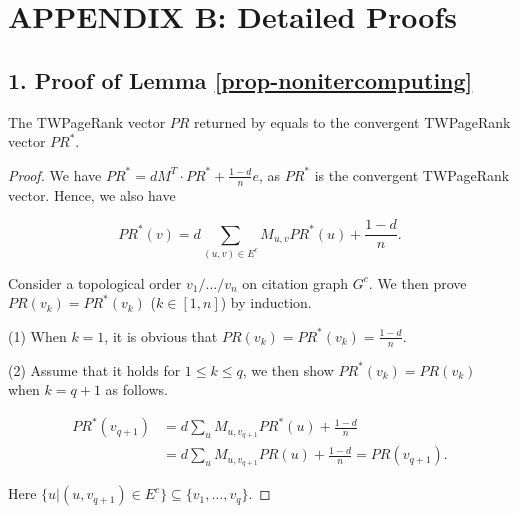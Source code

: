 \newpage


\section*{APPENDIX B: Detailed Proofs}
\label{sec-proof}

\subsection*{1. Proof of Lemma \ref{prop-nonitercomputing}}

The TWPageRank vector $PR$ returned by \twprdag equals to the convergent TWPageRank vector $PR^*$.

\begin{proof}
We have $PR^* = d M^T\cdot PR^* + \frac{1-d}{n} e$, as $PR^*$ is the convergent TWPageRank vector. Hence, we also have
\begin{small}
\begin{equation}
PR^*(v)=d \sum_{(u,v)\in E^c} M_{u,v} PR^*(u) + \frac{1-d}{n}.
\end{equation}
\end{small}

\vspace{-1ex}

Consider a topological order $v_1/\dots/v_n$ on citation graph $G^c$. We then prove $PR(v_k)=PR^*(v_k)$ ($k\in[1,n]$) by induction.

\noindent(1) When $k=1$, it is obvious that $PR(v_k)=PR^*(v_k)=\frac{1-d}{n}$. %

\noindent(2) Assume that it holds for $1\leq k \leq q$, we then show $PR^*(v_k)=PR(v_k)$ when $k=q+1$ as follows.
\begin{small}
\begin{equation*}
\begin{split}
PR^*(v_{q+1}) & = d \sum_u M_{u,v_{q+1}} PR^*(u) + \frac{1-d}{n} \\
 & = d \sum_u M_{u,v_{q+1}} PR(u) + \frac{1-d}{n}  = PR(v_{q+1}).
\end{split}
\end{equation*}
\end{small}

\vspace{-1ex}
\noindent Here $\{u|(u,v_{q+1})\in E^c\}\subseteq \{v_1,\dots,v_q\}$.
\end{proof}







